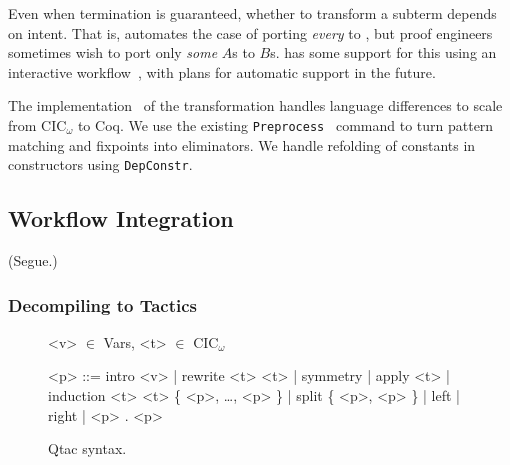 Even when termination is guaranteed, whether to transform a subterm depends on intent.
That is, \toolnamec automates the case of porting \textit{every} \Aa to \B,
but proof engineers sometimes wish to port only \textit{some} $A$s to $B$s.
\toolnamec has some support for this using an interactive workflow~\href{https://github.com/uwplse/pumpkin-pi/blob/v2.0.0/plugin/coq/minimal_records.v}{},
with plans for automatic support in the future. %

The implementation~\href{https://github.com/uwplse/pumpkin-pi/blob/v2.0.0/plugin/src/automation/lift/lift.ml}{} %
of the transformation handles language differences to scale from CIC$_{\omega}$ to Coq.
We use the existing \lstinline{Preprocess}~\cite{Ringer2019} command to turn pattern matching and fixpoints into 
eliminators.
We handle refolding of constants in constructors using \lstinline{DepConstr}.

\subsection{Workflow Integration}
\label{sec:pi-workflow}

(Segue.)

\subsubsection{Decompiling to Tactics}

\begin{figure*}
\small
\begin{grammar}
<v> $\in$ Vars, <t> $\in$ CIC$_{\omega}$

<p> ::= intro <v> \hspace{0.05cm} | \hspace{0.05cm} rewrite <t> <t> \hspace{0.05cm} | \hspace{0.05cm} symmetry \hspace{0.05cm} | \hspace{0.05cm} apply <t> \hspace{0.05cm} | \hspace{0.05cm} induction <t> <t> \{ <p>, \ldots, <p> \} \hspace{0.05cm} | \hspace{0.05cm} split \{ <p>, <p> \} \hspace{0.05cm} | \hspace{0.05cm} left \hspace{0.05cm} | \hspace{0.05cm} right \hspace{0.05cm} | \hspace{0.05cm} <p> . <p>
\end{grammar}
\vspace{-0.4cm}
\caption{Qtac syntax.}
\vspace{-0.4cm}
\label{fig:ltacsyntax1}
\end{figure*}

